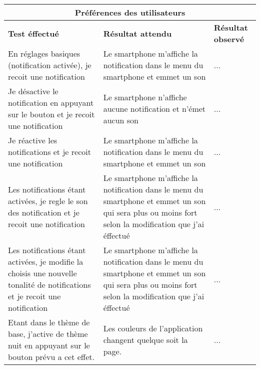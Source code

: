 \documentclass{article}
\begin{document}
  \begin{center}
    \begin{tabular}{|p{5cm}|p{5cm}|p{5cm}|}
      \hline
      \multicolumn{3}{|c|}{\textbf{Préférences des utilisateurs}} \\
      \hline
      \textbf{Test éffectué} & \textbf{Résultat attendu} & \textbf{Résultat observé} \\
      \hline

      En réglages basiques (notification activée), je recoit une notification&
      Le smartphone m'affiche la notification dans le menu du smartphone et emmet un son&
      ... \\

      \hline
      \hline
      Je désactive le notification en appuyant sur le bouton et je recoit une notification&
      Le smartphone n'affiche aucune notification et n'émet aucun son&
      ... \\

      \hline
      \hline
      Je réactive les notifications et je recoit une notification&
      Le smartphone m'affiche la notification dans le menu du smartphone et emmet un son&
      ... \\

      \hline
      \hline
      Les notifications étant activées, je regle le son des notification et je recoit une notification&
      Le smartphone m'affiche la notification dans le menu du smartphone et emmet un son qui sera plus ou moins fort selon la modification que j'ai éffectué&
      ... \\

      \hline
      \hline
      Les notifications étant activées, je modifie la choisis une nouvelle tonalité de notifications et je recoit une notification&
      Le smartphone m'affiche la notification dans le menu du smartphone et emmet un son qui sera plus ou moins fort selon la modification que j'ai éffectué&
      ... \\

      \hline
      \hline
      Etant dans le thème de base, j'active de thème nuit en appuyant sur le bouton prévu a cet effet.&
      Les couleurs de l'application changent quelque soit la page.&
      ... \\



      \hline

    \end{tabular}
  \end{center}
\end{document}
